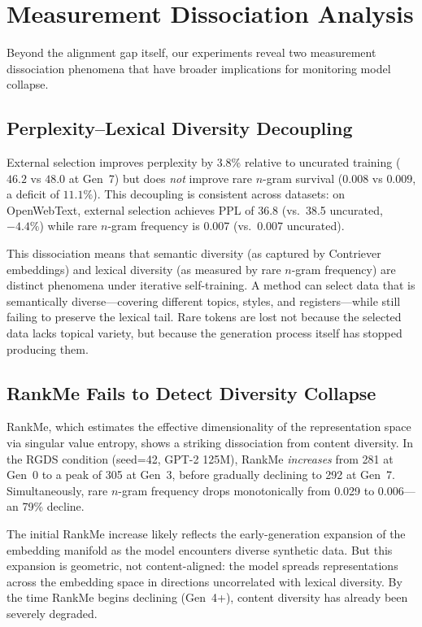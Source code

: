 \documentclass[11pt,a4paper]{article}
\begin{document}
\section{Measurement Dissociation Analysis}
\label{sec:dissociation}

Beyond the alignment gap itself, our experiments reveal two measurement dissociation phenomena that have broader implications for monitoring model collapse.

\subsection{Perplexity--Lexical Diversity Decoupling}
\label{sec:ppl-rare}

External selection improves perplexity by 3.8\% relative to uncurated training ($46.2$ vs $48.0$ at Gen~7) but does \emph{not} improve rare $n$-gram survival ($0.008$ vs $0.009$, a deficit of $11.1\%$).
This decoupling is consistent across datasets: on OpenWebText, external selection achieves PPL of 36.8 (vs.\ 38.5 uncurated, $-4.4\%$) while rare $n$-gram frequency is 0.007 (vs.\ 0.007 uncurated).

This dissociation means that semantic diversity (as captured by Contriever embeddings) and lexical diversity (as measured by rare $n$-gram frequency) are distinct phenomena under iterative self-training.
A method can select data that is semantically diverse---covering different topics, styles, and registers---while still failing to preserve the lexical tail.
Rare tokens are lost not because the selected data lacks topical variety, but because the generation process itself has stopped producing them.

\subsection{RankMe Fails to Detect Diversity Collapse}
\label{sec:rankme}

RankMe, which estimates the effective dimensionality of the representation space via singular value entropy, shows a striking dissociation from content diversity.
In the RGDS condition (seed=42, GPT-2 125M), RankMe \emph{increases} from 281 at Gen~0 to a peak of 305 at Gen~3, before gradually declining to 292 at Gen~7.
Simultaneously, rare $n$-gram frequency drops monotonically from 0.029 to 0.006---an 79\% decline.

The initial RankMe increase likely reflects the early-generation expansion of the embedding manifold as the model encounters diverse synthetic data.
But this expansion is geometric, not content-aligned: the model spreads representations across the embedding space in directions uncorrelated with lexical diversity.
By the time RankMe begins declining (Gen~4+), content diversity has already been severely degraded.
\end{document}

